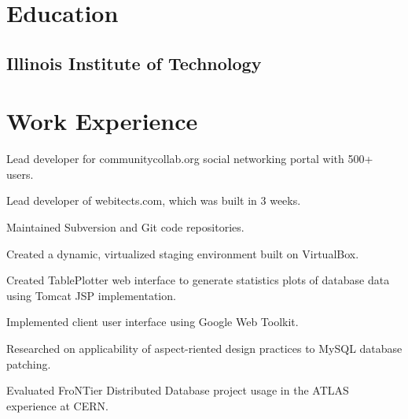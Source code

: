 \documentclass{resume}
\begin{document}
\author{Dmitry Ratnikov}
\maketitle

\section{Education}

\subsection{Illinois Institute of Technology}


\section{Work Experience}

\begin{compactitem}
  \item Lead developer for communitycollab.org social networking portal with 500+ users.
  \item Lead developer of webitects.com, which was built in 3 weeks.
  \item Maintained Subversion and Git code repositories.
  \item Created a dynamic, virtualized staging environment built on VirtualBox.
\end{compactitem}

\begin{compactitem}
  \item Created TablePlotter web interface to generate statistics plots of database data using Tomcat JSP implementation.
  \item Implemented client user interface using Google Web Toolkit.
\end{compactitem}

\begin{compactitem}
  \item Researched on applicability of aspect-riented design practices to MySQL database patching.
  \item Evaluated FroNTier Distributed Database project usage in the ATLAS experience at CERN.
\end{compactitem}
\end{document}
